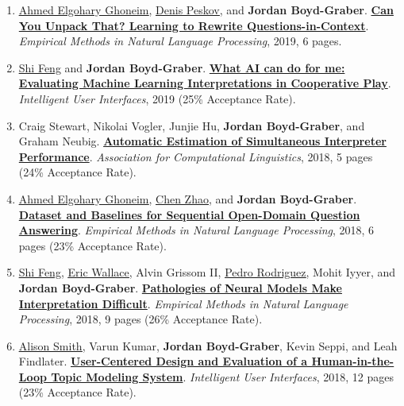 {\begin{enumerate}
	 \item \underline{\href{https://aagohary.github.io/}{Ahmed Elgohary Ghoneim}}, \underline{\href{https://denis.ai/}{Denis Peskov}}, and {\bf Jordan Boyd-Graber}.  {\bf \href{http://cs.umd.edu/~jbg//docs/2019_emnlp_sequentialqa.pdf}{Can You Unpack That? Learning to Rewrite Questions-in-Context}}.  \emph{Empirical Methods in Natural Language Processing}, 2019, 6 pages.

	 \item \underline{\href{https://ihsgnef.github.io/}{Shi Feng}} and {\bf Jordan Boyd-Graber}.  {\bf \href{http://cs.umd.edu/~jbg//docs/2019_iui_augment.pdf}{What AI can do for me: Evaluating Machine Learning Interpretations in Cooperative Play}}.  \emph{Intelligent User Interfaces}, 2019 (25\% Acceptance Rate).

	 \item Craig Stewart, Nikolai Vogler, Junjie Hu, {\bf Jordan Boyd-Graber}, and Graham Neubig.  {\bf \href{http://cs.umd.edu/~jbg//docs/2018_acl_interpeval.pdf}{Automatic Estimation of Simultaneous Interpreter Performance}}.  \emph{Association for Computational Linguistics}, 2018, 5 pages (24\% Acceptance Rate).

	 \item \underline{\href{https://aagohary.github.io/}{Ahmed Elgohary Ghoneim}}, \underline{\href{https://henryzhao5852.github.io/}{Chen Zhao}}, and {\bf Jordan Boyd-Graber}.  {\bf \href{http://cs.umd.edu/~jbg//docs/2018_emnlp_linked.pdf}{Dataset and Baselines for Sequential Open-Domain Question Answering}}.  \emph{Empirical Methods in Natural Language Processing}, 2018, 6 pages (23\% Acceptance Rate).

	 \item \underline{\href{https://ihsgnef.github.io/}{Shi Feng}}, \underline{\href{http://www.ericswallace.com/}{Eric Wallace}}, Alvin Grissom II, \underline{\href{https://www.pedro.ai/}{Pedro Rodriguez}}, Mohit Iyyer, and {\bf Jordan Boyd-Graber}.  {\bf \href{http://cs.umd.edu/~jbg//docs/2018_emnlp_rs.pdf}{Pathologies of Neural Models Make Interpretation Difficult}}.  \emph{Empirical Methods in Natural Language Processing}, 2018, 9 pages (26\% Acceptance Rate).

	 \item \underline{\href{http://alisonmsmith.github.io/}{Alison Smith}}, Varun Kumar, {\bf Jordan Boyd-Graber}, Kevin Seppi, and Leah Findlater.  {\bf \href{http://cs.umd.edu/~jbg//docs/2018_iui_itm.pdf}{User-Centered Design and Evaluation of a Human-in-the-Loop Topic Modeling System}}.  \emph{Intelligent User Interfaces}, 2018, 12 pages (23\% Acceptance Rate).


\end{enumerate}}
